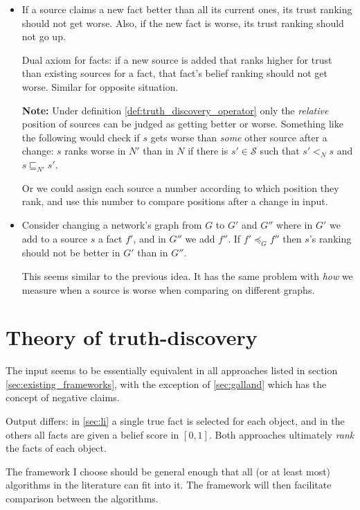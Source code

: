 \documentclass{article}
\theoremstyle{definition} \newtheorem{definition}{Definition}
\theoremstyle{definition} \newtheorem{example}{Example}
\theoremstyle{plain} \newtheorem{axiom}{Axiom}
\theoremstyle{plain} \newtheorem*{remark}{Remark}
\theoremstyle{remark} \newtheorem*{notation}{Notation}
\theoremstyle{plain} \newtheorem{lemma}{Lemma}
\theoremstyle{plain} \newtheorem{theorem}{Theorem}
\theoremstyle{plain} \newtheorem{proposition}{Proposition}
\renewcommand{\S}{\mathcal{S}}  %
\newcommand{\sle}{\sqsubseteq}
\newcommand{\fle}{\preceq}
\begin{document}
\begin{itemize}
\item If a source claims a new fact better than all its current ones, its trust
ranking should not get worse. Also, if the new fact is worse, its trust ranking
should not go up.

Dual axiom for facts: if a new source is added that ranks higher for trust than
existing sources for a fact, that fact's belief ranking should not get worse.
Similar for opposite situation.

\textbf{Note:} Under definition \ref{def:truth_discovery_operator} only the
\emph{relative} position of sources can be judged as getting better or worse.
Something like the following would check if $s$ gets worse than \emph{some}
other source after a change: $s$ ranks worse in $N'$ than in $N$ if there is
$s' \in \S$ such that $s' <_N s$ and $s \sle_{N'} s'$.

Or we could assign each source a number according to which position they rank,
and use this number to compare positions after a change in input.

\item Consider changing a network's graph from $G$ to $G'$ and $G''$ where in
$G'$ we add to a source $s$ a fact $f'$, and in $G''$ we add $f''$. If $f'
\fle_G f''$ then $s$'s ranking should not be better in $G'$ than in $G''$.

This seems similar to the previous idea. It has the same problem with
\emph{how} we measure when a source is worse when comparing on different graphs.

\end{itemize}

\section{Theory of truth-discovery}

The input seems to be essentially equivalent in all approaches listed in
section \ref{sec:existing_frameworks}, with the exception of \ref{sec:galland}
which has the concept of negative claims.

Output differs: in \ref{sec:li} a single true fact is selected for each object,
and in the others all facts are given a belief score in $[0, 1]$. Both
approaches ultimately \emph{rank} the facts of each object.

The framework I choose should be general enough that all (or at least most)
algorithms in the literature can fit into it. The framework will then
facilitate comparison between the algorithms.
\end{document}
